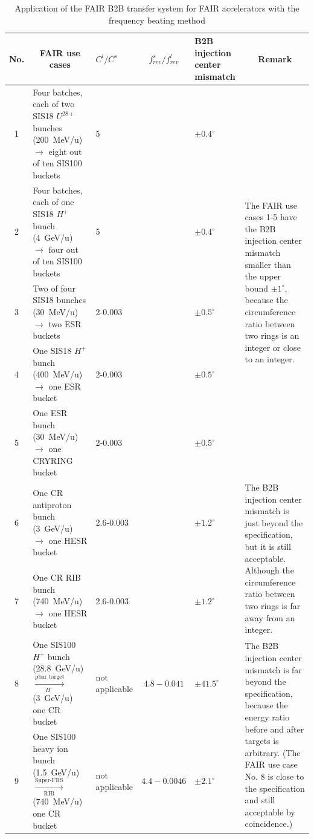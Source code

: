 
\begin{table}
\newcommand{\tabincell}[2]{\begin{tabular}{@{}#1@{}}#2\end{tabular}}
\caption{Application of the FAIR B2B transfer system for FAIR accelerators with the frequency beating method}
\label{use_application}
\begin{center}

    \begin{tabular}{| c | p{4cm}| p{1.5cm} | c | p{2.3cm} |p{6cm} |}
    \hline
     	No. & \multicolumn{1}{|c|}{FAIR use cases} & $C^l/C^s$  & $f^s_\mathit{rev}/f^l_\mathit{rev}$  &B2B injection center mismatch& \multicolumn{1}{|c|}{Remark} \\ \hline
1&	Four batches, each of two SIS18 $U^{28+}$ bunches (\SI{200}{MeV/u}) $\rightarrow$ eight out of ten SIS100 buckets	&	5 & &$\pm0.4^\circ$ 	& \multirow{5}{*}{\parbox{6cm}{The FAIR use cases 1-5 have the B2B injection center mismatch smaller than the upper bound $\pm1^\circ$, because the circumference ratio between two rings is an integer or close to an integer.}}\\ \cline{1-5}
2&Four batches, each of one SIS18 $H^{+}$ bunch (\SI{4}{GeV/u}) $\rightarrow$ four out of ten SIS100 buckets	&	5 & &	$\pm0.4^\circ$		& \\ \cline{1-5}
3&Two of four SIS18 bunches (\SI{30}{MeV/u}) $\rightarrow$ two ESR buckets			&	 2-0.003& &	$\pm0.5^\circ$	&\\ \cline{1-5}
4&One SIS18 $H^{+}$ bunch (\SI{400}{MeV/u}) $\rightarrow$ one ESR bucket	&	 2-0.003& & $\pm0.5^\circ$	& \\ \cline{1-5}
5&One ESR bunch (\SI{30}{MeV/u}) $\rightarrow$ one CRYRING bucket				&	 2-0.003& &$\pm0.5^\circ$	&	\\ \hline
6&One CR antiproton bunch (\SI{3}{GeV/u}) $\rightarrow$ one HESR bucket	 &2.6-0.003 & &$\pm1.2^\circ$& \multirow{2}{*}{\parbox{6cm}{The B2B injection center mismatch is just beyond the specification, but it is still acceptable. Although the circumference ratio between two rings is far away from an integer.}}\\ \cline{1-5}
7&One CR RIB bunch (\SI{740}{MeV/u}) $\rightarrow$ one HESR bucket	&2.6-0.003 & &$\pm1.2^\circ$ &\\ \hline
8&One SIS100 $H^{+}$ bunch (\SI{28.8}{GeV/u}) $\xrightarrow[\text{$H^{-}$}]{\text{pbar target}}$ (\SI{3}{GeV/u}) one CR bucket  & not applicable &$4.8-0.041$&$\pm41.5^\circ$& \multirow{5}{*}{\parbox{6cm}{The B2B injection center mismatch is far beyond the specification, because the energy ratio before and after targets is arbitrary. (The FAIR use case No. 8 is close to the specification and still acceptable by coincidence.)}}\\ \cline{1-5}
9&One SIS100 heavy ion bunch (\SI{1.5}{GeV/u}) $\xrightarrow[\text{RIB}]{\text{Super-FRS}}$ (\SI{740}{MeV/u}) one CR bucket 	&	not applicable &$4.4-0.0046$&$\pm2.1^\circ$	& \\ \cline{1-5}


\end{tabular}
\end{center}
\end{table}
